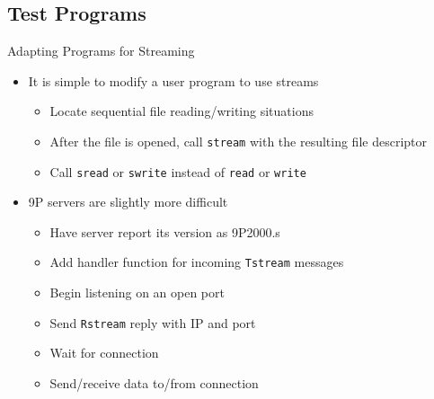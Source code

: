 \documentclass[11pt,compress]{beamer}
\begin{document}
\subsection{Test Programs}

\begin{frame}{Adapting Programs for Streaming}
\begin{itemize}
	\item It is simple to modify a user program to use streams
	\begin{itemize}
		\item Locate sequential file reading/writing situations
		\item After the file is opened, call {\tt stream} with the resulting file descriptor
		\item Call {\tt sread} or {\tt swrite} instead of {\tt read} or {\tt write}
	\end{itemize}
	\item 9P servers are slightly more difficult
	\begin{itemize}
		\item Have server report its version as 9P2000.s
		\item Add handler function for incoming {\tt Tstream} messages
		\item Begin listening on an open port
		\item Send {\tt Rstream} reply with IP and port
		\item Wait for connection
		\item Send/receive data to/from connection
	\end{itemize}
\end{itemize}
\end{frame}
\end{document}
